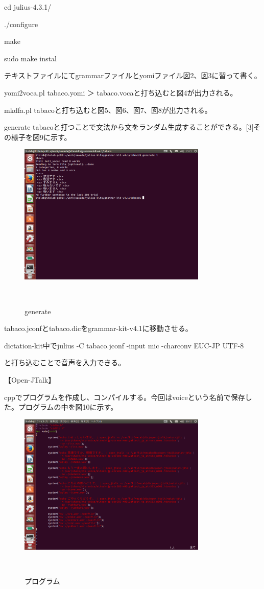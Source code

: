 \documentclass[11pt]{jsarticle}
\begin{document}
cd julius-4.3.1/


./configure


make


sudo make instal


テキストファイルにてgrammarファイルとyomiファイル図2、図3に習って書く。


yomi2voca.pl tabaco.yomi ＞ tabaco.vocaと打ち込むと図4が出力される。


mkdfa.pl tabacoと打ち込むと図5、図6、図7、図8が出力される。


generate tabacoと打つことで文法から文をランダム生成することができる。[3]その様子を図9に示す。

\begin{figure}[b]
 \begin{center}
  \includegraphics[width=90mm]{generate.png}
 　\caption{generate}
 　\label{fig:kinshi}
 \end{center}
\end{figure}


tabaco.jconfとtabaco.dicをgrammar-kit-v4.1に移動させる。


dictation-kit中でjulius -C tabaco.jconf -input mic -charconv EUC-JP UTF-8


と打ち込むことで音声を入力できる。


【Open-JTalk】


cppでプログラムを作成し、コンパイルする。今回はvoiceという名前で保存した。プログラムの中を図10に示す。

\begin{figure}[b]
 \begin{center}
  \includegraphics[width=90mm]{voice.png}
 　\caption{プログラム}
 　\label{fig:kinshi}
 \end{center}
\end{figure}
\end{document}
